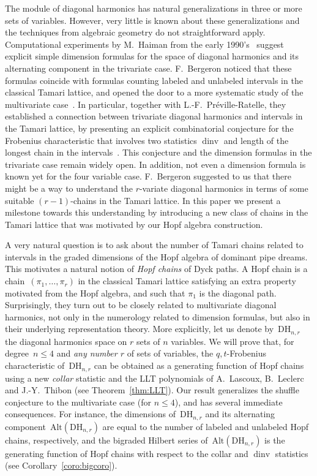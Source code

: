 \documentclass{amsart}
\theoremstyle{definition}
\newcommand{\DiagHarm}[2]{\mathrm{DH}_{#1,#2}} %
\newcommand{\dinv}{\operatorname{dinv}} %
\newcommand{\Alt}{\mathrm{Alt}} %
\begin{document}
The module of diagonal harmonics has natural generalizations in three or more sets of variables.
However, very little is known about these generalizations and the techniques from algebraic geometry do not straightforward apply.
Computational experiments by M.~Haiman from the early 1990's~\cite[Fact~2.8.1]{Haiman-conjectures} suggest explicit simple dimension formulas for the space of diagonal harmonics and its alternating component in the trivariate case.  
F.~Bergeron noticed that these formulas coincide with formulas counting labeled and unlabeled intervals in the classical Tamari lattice, and opened the door to a more systematic study of the multivariate case~\cite{BergeronPrevilleRatelle,Bergeron-multivariateDiagonalCoinvariantSpaces}. 
In particular, together with L.-F.~Pr\'eville-Ratelle, they established a connection between trivariate diagonal harmonics and intervals in the Tamari lattice, by presenting an explicit combinatorial conjecture for the Frobenius characteristic that involves two statistics $\dinv$ and length of the longest chain in the intervals~\cite[Conj.~1]{BergeronPrevilleRatelle}.  
This conjecture and the dimension formulas in the trivariate case remain widely open. In addition, not even a dimension formula is known yet for the four variable case.
F.~Bergeron suggested to us that there might be a way to understand the $r$-variate diagonal harmonics in terms of some suitable $(r-1)$-chains in the Tamari lattice.
In this paper we present a milestone towards this understanding by introducing a new class of chains in the Tamari lattice that was motivated by our Hopf algebra construction.

A very natural question is to ask about the number of Tamari chains related to intervals in the graded dimensions of the Hopf algebra of dominant pipe dreams.
This motivates a natural notion of \emph{Hopf chains} of Dyck paths.
A Hopf chain is a chain~$(\pi_1,\dots,\pi_r)$ in the classical Tamari lattice satisfying an extra property motivated from the Hopf algebra, and such that $\pi_1$ is the diagonal path. Surprisingly, they turn out to be closely related to multivariate diagonal harmonics, not only in the numerology related to dimension formulas, but also in their underlying representation theory. More explicitly, let us denote by~$\DiagHarm{n}{r}$ the diagonal harmonics space on $r$ sets of $n$ variables.
We will prove that, for degree~$n\leq 4$ and \emph{any number $r$} of sets of variables, the $q,t$-Frobenius characteristic of~$\DiagHarm{n}{r}$ can be obtained as a generating function of Hopf chains using a new \emph{collar} statistic and the LLT polynomials of A.~Lascoux, B.~Leclerc and J.-Y.~Thibon (see Theorem~\ref{thm:LLT}).
Our result generalizes the shuffle conjecture to the multivariate case (for $n\leq 4$), and has several immediate consequences. 
For instance, the dimensions of~$\DiagHarm{n}{r}$ and its alternating component~$\Alt(\DiagHarm{n}{r})$ are equal to the number of labeled and unlabeled Hopf chains, respectively, and the bigraded Hilbert series of~$\Alt(\DiagHarm{n}{r})$ is the generating function of Hopf chains with respect to the collar and $\dinv$ statistics (see Corollary~\ref{coro:bigcoro}).    
\end{document}
